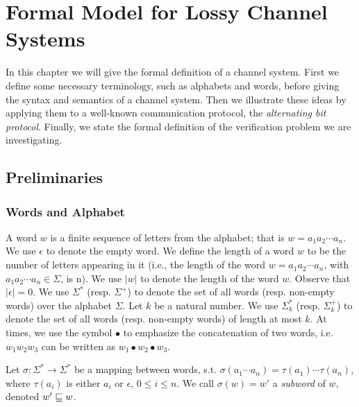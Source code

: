 \section{Formal Model for Lossy Channel Systems}
\label{definitions}
In this chapter we will give the formal definition of a channel system. First we define some necessary terminology, such as alphabets and words, before giving the syntax and semantics of a channel system. Then we illustrate these ideas by applying them to a well-known communication protocol, the \emph{alternating bit protocol}. Finally, we state the formal definition of the verification problem we are investigating.

\subsection{Preliminaries}
\subsubsection{Words and Alphabet}
A word  $w$ is a finite sequence of letters  from the alphabet; that is $ w=a_1 a_2 \cdots a_n$. We use $\epsilon$  to denote the empty word. We define the length  of a word $w$ to be the number of letters appearing in it (i.e., the length of the word $w=a_1 a_2 \cdots a_n$, with $a_1 a_2 \cdots a_n\in \Sigma$, is n). We use $|w|$ to denote the length of the word $w$. Observe that $|\epsilon|=0$. We use $\Sigma^*$  (resp. $\Sigma^+$) to denote the set of all  words (resp. non-empty words) over the alphabet $\Sigma$.  Let $k$ be a natural number.  We use $\Sigma_k^*$  (resp. $\Sigma_k^+$) to denote the set of all  words (resp. non-empty words)  of length at most $k$. At times, we use the symbol $\bullet$ to emphasize the concatenation of two words, i.e. $w_1w_2w_3$ can be written as $w_1 \bullet w_2 \bullet w_3$.


Let $\sigma : \Sigma^* \rightarrow \Sigma^*$ be a mapping between words, s.t. $\sigma(a_1\cdots a_n) = \tau(a_1)\cdots \tau(a_n)$, where $\tau(a_i)$ is either $a_i$ or $\epsilon$, $0 \leq i \leq n$. We call $\sigma(w) = w'$ a \emph{subword} of $w$, denoted $w' \sqsubseteq w$.

